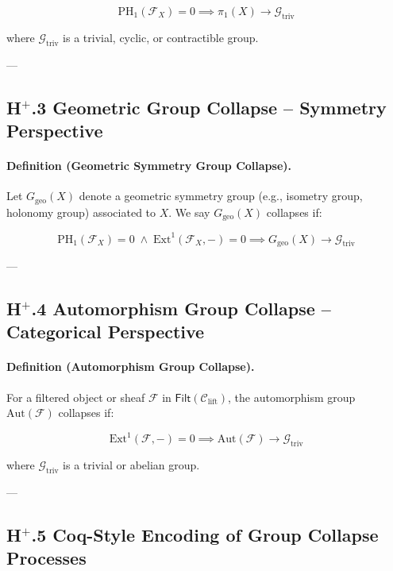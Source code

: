 \documentclass[11pt]{article}
\begin{document}
\[
\mathrm{PH}_1(\mathcal{F}_X) = 0 \implies \pi_1(X) \longrightarrow \mathcal{G}_{\mathrm{triv}}
\]

where $\mathcal{G}_{\mathrm{triv}}$ is a trivial, cyclic, or contractible group.

---

\subsection*{H$^{+}$.3 Geometric Group Collapse – Symmetry Perspective}

\paragraph{Definition (Geometric Symmetry Group Collapse).}

Let $G_{\mathrm{geo}}(X)$ denote a geometric symmetry group (e.g., isometry group, holonomy group) associated to $X$. We say $G_{\mathrm{geo}}(X)$ collapses if:

\[
\mathrm{PH}_1(\mathcal{F}_X) = 0 \;\land\; \mathrm{Ext}^1(\mathcal{F}_X, -) = 0 \implies G_{\mathrm{geo}}(X) \longrightarrow \mathcal{G}_{\mathrm{triv}}
\]

---

\subsection*{H$^{+}$.4 Automorphism Group Collapse – Categorical Perspective}

\paragraph{Definition (Automorphism Group Collapse).}

For a filtered object or sheaf $\mathcal{F}$ in $\mathsf{Filt}(\mathcal{C}_{\mathrm{lift}})$, the automorphism group $\mathrm{Aut}(\mathcal{F})$ collapses if:

\[
\mathrm{Ext}^1(\mathcal{F}, -) = 0 \implies \mathrm{Aut}(\mathcal{F}) \longrightarrow \mathcal{G}_{\mathrm{triv}}
\]

where $\mathcal{G}_{\mathrm{triv}}$ is a trivial or abelian group.

---

\subsection*{H$^{+}$.5 Coq-Style Encoding of Group Collapse Processes}
\end{document}
